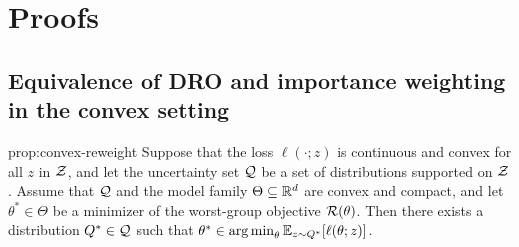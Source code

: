 \section{Proofs}

\subsection{Equivalence of DRO and importance weighting in the convex setting}\label{sec:proof_convex}

\begin{repproposition}{prop:convex-reweight}
  Suppose that the loss $\ell(\cdot; z)$ is continuous and convex for all $z$ in $\mathcal{Z}$,
  and let the uncertainty set $\mathcal{Q}$ be a set of distributions supported on $\mathcal{Z}$.
  Assume that $\mathcal{Q}$ and the model family $\Theta \subseteq \mathbb{R}^d$ are convex and compact,
  and let $\theta^* \in \Theta$ be a minimizer of the worst-group objective $\mathcal{R}(\theta)$.
  Then there exists a distribution $Q^* \in \mathcal{Q}$ such that $\theta^* \in \operatorname*{arg\,min}_\theta \mathbb{E}_{z \sim Q^*} [\ell(\theta;z)]$.
\end{repproposition}

